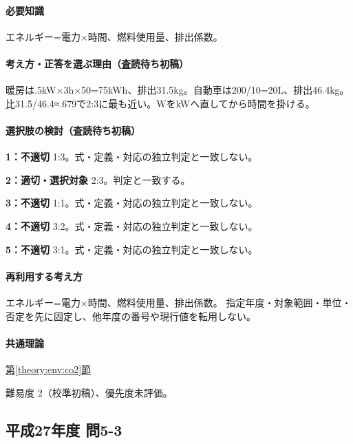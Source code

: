 \paragraph{必要知識} エネルギー=電力×時間、燃料使用量、排出係数。

\paragraph{考え方・正答を選ぶ理由（査読待ち初稿）} 暖房は.5kW×3h×50=\allowbreak{}75kWh、排出31.5kg。自動車は200/10=\allowbreak{}20L、排出46.4kg。比31.5/46.4≈.679で2:3に最も近い。WをkWへ直してから時間を掛ける。

\paragraph{選択肢の検討（査読待ち初稿）}\mbox{}\par

\noindent\textbf{1：不適切} 1:3。式・定義・対応の独立判定と一致しない。\par

\noindent\textbf{2：適切・選択対象} 2:3。判定と一致する。\par

\noindent\textbf{3：不適切} 1:1。式・定義・対応の独立判定と一致しない。\par

\noindent\textbf{4：不適切} 3:2。式・定義・対応の独立判定と一致しない。\par

\noindent\textbf{5：不適切} 3:1。式・定義・対応の独立判定と一致しない。\par

\paragraph{再利用する考え方} エネルギー=電力×時間、燃料使用量、排出係数。 指定年度・対象範囲・単位・否定を先に固定し、他年度の番号や現行値を転用しない。

\paragraph{共通理論} \hyperref[theory:env:co2]{第\ref*{theory:env:co2}節}

\par 難易度 2（校準初稿）、優先度未評価。

\subsection{平成27年度 問5-3}
\label{q:h27-reg-basic-5-3}

